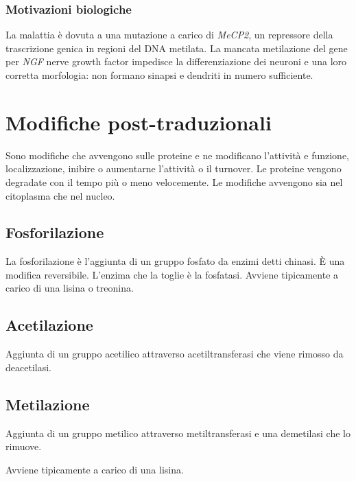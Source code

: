 		\subsubsection{Motivazioni biologiche}
		La malattia \`e dovuta a una mutazione a carico di \emph{MeCP2}, un repressore della trascrizione genica in regioni del DNA metilata.
		La mancata metilazione del gene per \emph{NGF} nerve growth factor impedisce la differenziazione dei neuroni e una loro corretta morfologia: non formano sinapsi e dendriti in numero sufficiente.

\section{Modifiche post-traduzionali}
Sono modifiche che avvengono sulle proteine e ne modificano l'attivit\`a e funzione, localizzazione, inibire o aumentarne l'attivit\`a o il turnover. 
Le proteine vengono degradate con il
tempo pi\`u o meno velocemente.
Le modifiche avvengono sia nel citoplasma che nel nucleo.

	\subsection{Fosforilazione}
	La fosforilazione \`e l'aggiunta di un gruppo fosfato da enzimi detti chinasi. 
\`E una modifica reversibile. 
L'enzima che la toglie \`e la fosfatasi.
	Avviene tipicamente a carico di una lisina o treonina.

	\subsection{Acetilazione}
	Aggiunta di un gruppo acetilico attraverso acetiltransferasi che viene rimosso da deacetilasi. 


	\subsection{Metilazione}
	Aggiunta di un gruppo metilico attraverso metiltransferasi e una demetilasi che lo rimuove. 

	Avviene tipicamente a carico di una lisina.

